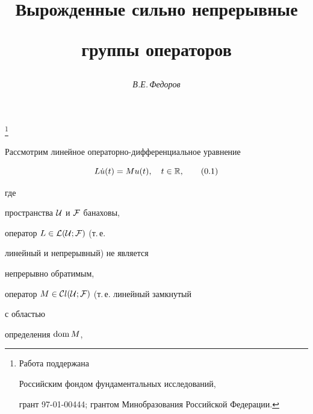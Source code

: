 



 


\author{\it В.Е.\,Федоров} 




\title{Вырожденные сильно непрерывные


группы операторов}


\thanks{Работа поддержана


Российским фондом фундаментальных исследований,


грант 97-01-00444; грантом  Минобразования Российской Федерации.}


 


\date{} 




\pagestyle{plain} %


 




\maketitle 


\label{begin} 


 





Рассмотрим линейное операторно-дифференциальное уравнение


\begin{equation}


L\Dot u(t)=Mu(t),\quad t\in {\Bbb R},\tag{0.1}


\end{equation}


где


пространства ${\cal U}$ и ${\cal F}$ банаховы,


оператор $L\in {\cal L(\cal U;\cal F)}$ (т.\,е.


линейный и непрерывный) не является


непрерывно обратимым,


оператор $M\in {\cal C}l{(\cal U;\cal F)}$ (т.\,е. линейный замкнутый


с областью


определения $\operatorname{dom} M$,


